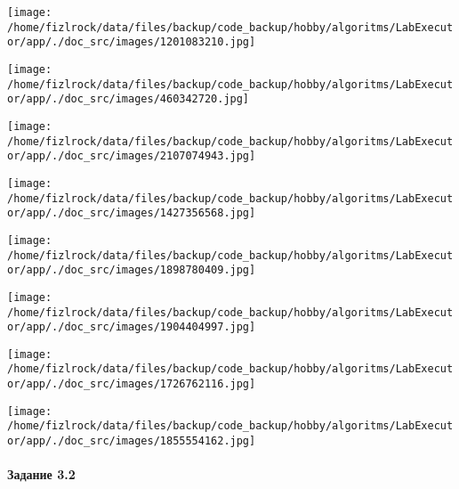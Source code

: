 \documentclass[a4paper, 12pt]{article}
\begin{document}
\texttt{[image: /home/fizlrock/data/files/backup/code\_backup/hobby/algoritms/LabExecutor/app/./doc\_src/images/1201083210.jpg]}

\texttt{[image: /home/fizlrock/data/files/backup/code\_backup/hobby/algoritms/LabExecutor/app/./doc\_src/images/460342720.jpg]}

\texttt{[image: /home/fizlrock/data/files/backup/code\_backup/hobby/algoritms/LabExecutor/app/./doc\_src/images/2107074943.jpg]}

\texttt{[image: /home/fizlrock/data/files/backup/code\_backup/hobby/algoritms/LabExecutor/app/./doc\_src/images/1427356568.jpg]}

\texttt{[image: /home/fizlrock/data/files/backup/code\_backup/hobby/algoritms/LabExecutor/app/./doc\_src/images/1898780409.jpg]}

\texttt{[image: /home/fizlrock/data/files/backup/code\_backup/hobby/algoritms/LabExecutor/app/./doc\_src/images/1904404997.jpg]}

\texttt{[image: /home/fizlrock/data/files/backup/code\_backup/hobby/algoritms/LabExecutor/app/./doc\_src/images/1726762116.jpg]}

\texttt{[image: /home/fizlrock/data/files/backup/code\_backup/hobby/algoritms/LabExecutor/app/./doc\_src/images/1855554162.jpg]}
\pagebreak

\paragraph{Задание 3.2}
\end{document}
